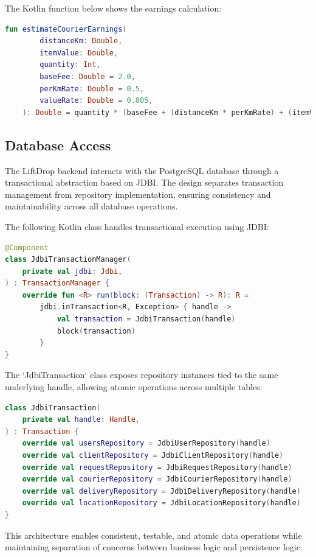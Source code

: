 \noindent The Kotlin function below shows the earnings calculation:

\begin{lstlisting}[language=Kotlin, caption={Calculation of Courier Earnings}]
fun estimateCourierEarnings(
        distanceKm: Double,
        itemValue: Double,
        quantity: Int,
        baseFee: Double = 2.0,
        perKmRate: Double = 0.5,
        valueRate: Double = 0.005,
    ): Double = quantity * (baseFee + (distanceKm * perKmRate) + (itemValue * valueRate))
\end{lstlisting}

\subsection{Database Access}

The LiftDrop backend interacts with the PostgreSQL database through a transactional abstraction based on JDBI. The design separates transaction management from repository implementation, ensuring consistency and maintainability across all database operations.

The following Kotlin class handles transactional execution using JDBI:

\begin{lstlisting}[language=Kotlin, caption={JDBI Transaction Manager}]
@Component
class JdbiTransactionManager(
    private val jdbi: Jdbi,
) : TransactionManager {
    override fun <R> run(block: (Transaction) -> R): R =
        jdbi.inTransaction<R, Exception> { handle ->
            val transaction = JdbiTransaction(handle)
            block(transaction)
        }
}
\end{lstlisting}

The `JdbiTransaction` class exposes repository instances tied to the same underlying handle, allowing atomic operations across multiple tables:

\begin{lstlisting}[language=Kotlin, caption={JDBI Transaction with Repository Bindings}]
class JdbiTransaction(
    private val handle: Handle,
) : Transaction {
    override val usersRepository = JdbiUserRepository(handle)
    override val clientRepository = JdbiClientRepository(handle)
    override val requestRepository = JdbiRequestRepository(handle)
    override val courierRepository = JdbiCourierRepository(handle)
    override val deliveryRepository = JdbiDeliveryRepository(handle)
    override val locationRepository = JdbiLocationRepository(handle)
}
\end{lstlisting}

This architecture enables consistent, testable, and atomic data operations while maintaining separation of concerns between business logic and persistence logic.




